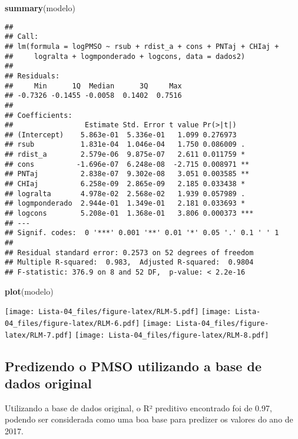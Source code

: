 \documentclass[
]{article}
\newenvironment{Shaded}{\begin{snugshade}}{\end{snugshade}}
\newcommand{\KeywordTok}[1]{\textcolor[rgb]{0.13,0.29,0.53}{\textbf{#1}}}
\newcommand{\NormalTok}[1]{#1}
\begin{document}
\begin{Shaded}
\begin{Highlighting}[]
\KeywordTok{summary}\NormalTok{(modelo)}
\end{Highlighting}
\end{Shaded}

\begin{verbatim}
## 
## Call:
## lm(formula = logPMSO ~ rsub + rdist_a + cons + PNTaj + CHIaj + 
##     logralta + logmponderado + logcons, data = dados2)
## 
## Residuals:
##     Min      1Q  Median      3Q     Max 
## -0.7326 -0.1455 -0.0058  0.1402  0.7516 
## 
## Coefficients:
##                 Estimate Std. Error t value Pr(>|t|)    
## (Intercept)    5.863e-01  5.336e-01   1.099 0.276973    
## rsub           1.831e-04  1.046e-04   1.750 0.086009 .  
## rdist_a        2.579e-06  9.875e-07   2.611 0.011759 *  
## cons          -1.696e-07  6.248e-08  -2.715 0.008971 ** 
## PNTaj          2.838e-07  9.302e-08   3.051 0.003585 ** 
## CHIaj          6.258e-09  2.865e-09   2.185 0.033438 *  
## logralta       4.978e-02  2.568e-02   1.939 0.057989 .  
## logmponderado  2.944e-01  1.349e-01   2.181 0.033693 *  
## logcons        5.208e-01  1.368e-01   3.806 0.000373 ***
## ---
## Signif. codes:  0 '***' 0.001 '**' 0.01 '*' 0.05 '.' 0.1 ' ' 1
## 
## Residual standard error: 0.2573 on 52 degrees of freedom
## Multiple R-squared:  0.983,  Adjusted R-squared:  0.9804 
## F-statistic: 376.9 on 8 and 52 DF,  p-value: < 2.2e-16
\end{verbatim}

\begin{Shaded}
\begin{Highlighting}[]
\KeywordTok{plot}\NormalTok{(modelo)}
\end{Highlighting}
\end{Shaded}

\texttt{[image: Lista-04\_files/figure-latex/RLM-5.pdf]}
\texttt{[image: Lista-04\_files/figure-latex/RLM-6.pdf]}
\texttt{[image: Lista-04\_files/figure-latex/RLM-7.pdf]}
\texttt{[image: Lista-04\_files/figure-latex/RLM-8.pdf]}

\hypertarget{predizendo-o-pmso-utilizando-a-base-de-dados-original}{%
\subsection{Predizendo o PMSO utilizando a base de dados
original}\label{predizendo-o-pmso-utilizando-a-base-de-dados-original}}

Utilizando a base de dados original, o R² preditivo encontrado foi de
0.97, podendo ser considerada como uma boa base para predizer os valores
do ano de 2017.
\end{document}

